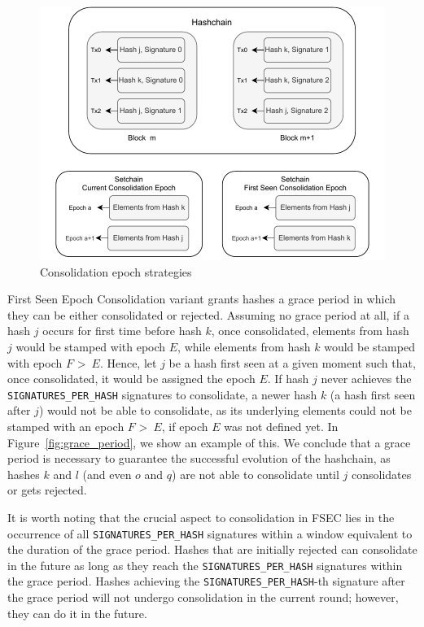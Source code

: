 \begin{figure}
  \centering
  \includegraphics[scale=0.5]{figures/consolidation_epoch.pdf}
  \caption{Consolidation epoch strategies}
  \label{fig:consolidation_epoch}
\end{figure}

First Seen Epoch Consolidation variant grants hashes a grace period in which
they can be either consolidated or rejected.
%
Assuming no grace period at all, if a hash $j$ occurs for
first time before hash $k$, once consolidated, elements from hash $j$ would be
stamped with epoch $E$, while elements from hash $k$ would be stamped with epoch
$F$ \textgreater \ $E$.
%
Hence, let $j$ be a hash first seen at a given moment such
that, once consolidated, it would be assigned the epoch $E$.
%
If hash $j$ never achieves the \texttt{SIGNATURES\_PER\_HASH} signatures to
consolidate, a newer hash $k$ (a hash first seen after $j$) would not be able to
consolidate, as its underlying elements could not be stamped with an epoch $F$
\textgreater \ $E$, if epoch $E$ was not defined yet.
%
In Figure~\ref{fig:grace_period}, we show an example of this.
%
We conclude that a grace period is necessary to guarantee the successful evolution of
the hashchain, as hashes $k$ and $l$ (and even $o$ and $q$) are not able to
consolidate until $j$ consolidates or gets rejected.


It is worth noting that the crucial aspect to consolidation in FSEC lies in the
occurrence of all \texttt{SIGNATURES\_PER\_HASH} signatures within a window
equivalent to the duration of the grace period.
%
Hashes that are initially rejected can consolidate in the future as long as
they reach the \texttt{SIGNATURES\_PER\_HASH} signatures within the grace period.
%
Hashes achieving the \texttt{SIGNATURES\_PER\_HASH}-th signature after
the grace period will not undergo consolidation in the current round;
however, they can do it in the future.

